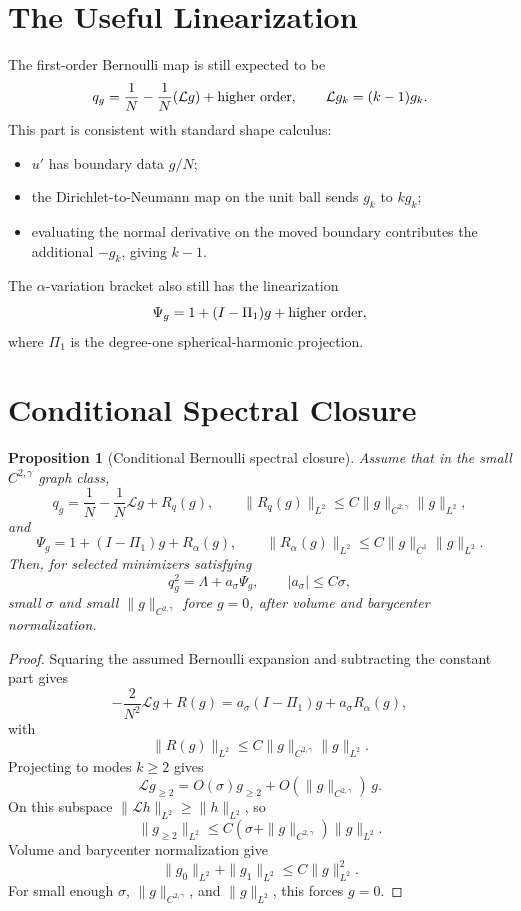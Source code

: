 \documentclass[11pt]{article}
\newtheorem{proposition}[theorem]{Proposition}
\theoremstyle{definition}
\begin{document}
\section{The Useful Linearization}

The first-order Bernoulli map is still expected to be
\[
q_g
=
\frac1N-\frac1N(\mathcal L g)+\hbox{higher order},
\qquad
\mathcal L g_k=(k-1)g_k.
\]
This part is consistent with standard shape calculus:
\begin{itemize}
\item \(u'\) has boundary data \(g/N\);
\item the Dirichlet-to-Neumann map on the unit ball sends \(g_k\) to \(k g_k\);
\item evaluating the normal derivative on the moved boundary contributes the
additional \(-g_k\), giving \(k-1\).
\end{itemize}
The \(\alpha\)-variation bracket also still has the linearization
\[
\Psi_g=1+(I-\Pi_1)g+\hbox{higher order},
\]
where \(\Pi_1\) is the degree-one spherical-harmonic projection.

\section{Conditional Spectral Closure}

\begin{proposition}[Conditional Bernoulli spectral closure]
Assume that in the small \(C^{2,\gamma}\) graph class,
\[
q_g=\frac1N-\frac1N\mathcal L g+R_q(g),
\qquad
\|R_q(g)\|_{L^2}\le C\|g\|_{C^{2,\gamma}}\|g\|_{L^2},
\]
and
\[
\Psi_g=1+(I-\Pi_1)g+R_\alpha(g),
\qquad
\|R_\alpha(g)\|_{L^2}\le C\|g\|_{C^1}\|g\|_{L^2}.
\]
Then, for selected minimizers satisfying
\[
q_g^2=\Lambda+a_\sigma\Psi_g,\qquad |a_\sigma|\le C\sigma,
\]
small \(\sigma\) and small \(\|g\|_{C^{2,\gamma}}\) force \(g=0\), after
volume and barycenter normalization.
\end{proposition}

\begin{proof}
Squaring the assumed Bernoulli expansion and subtracting the constant part gives
\[
-\frac{2}{N^2}\mathcal Lg+R(g)
=a_\sigma(I-\Pi_1)g+a_\sigma R_\alpha(g),
\]
with
\[
\|R(g)\|_{L^2}\le C\|g\|_{C^{2,\gamma}}\|g\|_{L^2}.
\]
Projecting to modes \(k\ge2\) gives
\[
\mathcal Lg_{\ge2}
=O(\sigma)g_{\ge2}
+O(\|g\|_{C^{2,\gamma}})\,g .
\]
On this subspace \(\|\mathcal Lh\|_{L^2}\ge\|h\|_{L^2}\), so
\[
\|g_{\ge2}\|_{L^2}
\le C(\sigma+\|g\|_{C^{2,\gamma}})\|g\|_{L^2}.
\]
Volume and barycenter normalization give
\[
\|g_0\|_{L^2}+\|g_1\|_{L^2}\le C\|g\|_{L^2}^2.
\]
For small enough \(\sigma\), \(\|g\|_{C^{2,\gamma}}\), and \(\|g\|_{L^2}\), this
forces \(g=0\).
\end{proof}
\end{document}
